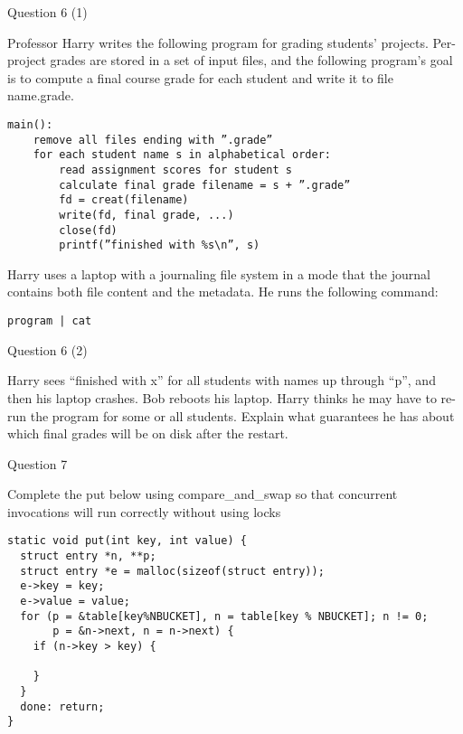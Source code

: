   \begin{frame}[fragile]{Question 6 (1)}

    Professor Harry writes the following program for grading
    students’ projects. Per-project grades are stored in a set of input files,
    and the following program’s goal is to compute a final course grade for each
    student and write it to file name.grade.

    \begin{lstlisting}
main():
    remove all files ending with ”.grade”
    for each student name s in alphabetical order:
        read assignment scores for student s
        calculate final grade filename = s + ”.grade”
        fd = creat(filename)
        write(fd, final grade, ...)
        close(fd)
        printf(”finished with %s\n”, s)
    \end{lstlisting}

    Harry uses a laptop with a journaling file system in a mode that the journal
contains both file content and the metadata. He runs the following command:

    \lstinline!program | cat!
  \end{frame}

  \begin{frame}{Question 6 (2)}

Harry sees “finished with x” for all students with names up through “p”, and then
his laptop crashes. Bob reboots his laptop.
Harry thinks he may have to re-run the program for some or all students. Explain what
guarantees he has about which final grades will be on disk after the restart.
  \end{frame}

  \begin{frame}[fragile]{Question 7}

    Complete the put below using compare\_and\_swap so that concurrent invocations
will run correctly without using locks

    \vspace{1em}

    \begin{lstlisting}
static void put(int key, int value) {
  struct entry *n, **p;
  struct entry *e = malloc(sizeof(struct entry));
  e->key = key;
  e->value = value;
  for (p = &table[key%NBUCKET], n = table[key % NBUCKET]; n != 0;
       p = &n->next, n = n->next) {
    if (n->key > key) {

    }
  }
  done: return;
}
    \end{lstlisting}
  \end{frame}


